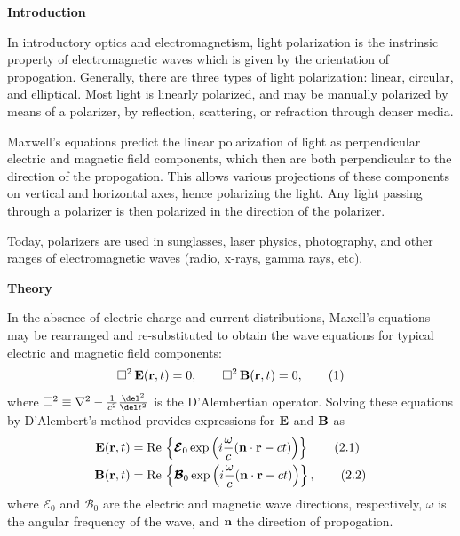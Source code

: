 \documentclass[11pt]{article}
\begin{document}
\begin{multicols}{2}


     \selectfont \textbf{Introduction}
    
     \selectfont 
    
    In introductory optics and electromagnetism, light polarization is the instrinsic property of electromagnetic waves which is given by the orientation of propogation. Generally, there are three types of light polarization: linear, circular, and elliptical. Most light is linearly polarized, and may be manually polarized by means of a polarizer, by reflection, scattering, or refraction through denser media. 
    
    Maxwell's equations predict the linear polarization of light as perpendicular electric and magnetic field components, which then are both perpendicular to the direction of the propogation. This allows various projections of these components on vertical and horizontal axes, hence polarizing the light. Any light passing through a polarizer is then polarized in the direction of the polarizer. 

    Today, polarizers are used in sunglasses, laser physics, photography, and other ranges of electromagnetic waves (radio, x-rays, gamma rays, etc). 
    
    
    
    \vspace{10pt}

     \selectfont \textbf{Theory}
    
     \selectfont In the absence of electric charge and current distributions, Maxell's equations may be rearranged and re-substituted to obtain the wave equations for typical electric and magnetic field components:
    \[
        \square^2\, {\bf{E}}({\bf{r}}, t) = 0, \qquad \square^2\, {\bf{B}}({\bf{r}}, t) = 0, \tag{1}
    \]
    \nd where $\square^2 \equiv \nabla^2 - \frac{1}{c^2}\frac{\del^2}{\del t^2}$ is the D'Alembertian operator. Solving these equations by D'Alembert's method provides expressions for ${\bf{E}}$ and ${\bf{B}}$ as
    \begin{align*}
        {\bf{E}}({\bf{r}}, t) &= \text{Re}\,\left\{\boldsymbol{\mathcal{E}}_0\exp\left(i\frac{\omega}{c}({\bf{n}}\cdot {\bf{r}} - ct)\right)\right\} \tag{2.1}\\
        {\bf{B}}({\bf{r}}, t) &= \text{Re}\,\left\{\boldsymbol{\mathcal{B}}_0\exp\left(i\frac{\omega}{c}({\bf{n}}\cdot {\bf{r}} - ct)\right)\right\}, \tag{2.2}
    \end{align*}
    \nd where $\boldsymbol{\mathcal{E}}_0$ and $\boldsymbol{\mathcal{B}}_0$ are the electric and magnetic wave directions, respectively, $\omega$ is the angular frequency of the wave, and ${\bf{n}}$ the direction of propogation.
    

\end{multicols}
\end{document}
